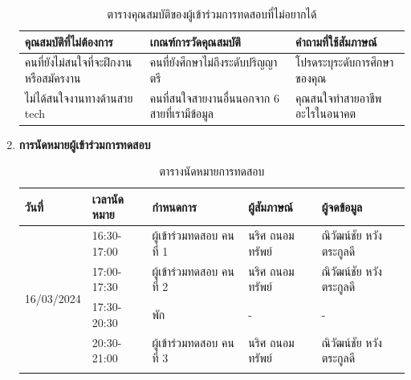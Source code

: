 \begin{enumerate}
\begin{table}[H]
\begin{tabularx}{\textwidth}{|X|X|X|}
              \end{tabularx}
          \end{table}
          \begin{table}[H]
              \caption{ตารางคุณสมบัติของผู้เข้าร่วมการทดสอบที่ไม่อยากได้}
              \label{tab:excludeUT}
              \begin{tabularx}{\textwidth}{|X|X|X|}
                  \hline
                  \textbf{คุณสมบัติที่ไม่ต้องการ}      & \textbf{เกณฑ์การวัดคุณสมบัติ}             & \textbf{คำถามที่ใช้สัมภาษณ์}    \\ \hline
                  คนที่ยังไม่สนใจที่จะฝึกงานหรือสมัครงาน & คนที่ยังศึกษาไม่ถึงระดับปริญญาตรี             & โปรดระบุระดับการศึกษาของคุณ   \\ \hline
                  ไม่ได้สนใจงานทางด้านสาย tech     & คนที่สนใจสายงานอื่นนอกจาก 6 สายที่เรามีข้อมูล & คุณสนใจทำสายอาชีพอะไรในอนาคต \\ \hline
              \end{tabularx}
          \end{table}
    \item \textbf{การนัดหมายผู้เข้าร่วมการทดสอบ}
          \begin{table}[H]
              \caption{ตารางนัดหมายการทดสอบ}
              \label{tab:schedule-UT}
              \begin{tabular}{|r|l|l|l|l|}
                  \hline
                  \multicolumn{1}{|l|}{\textbf{วันที่}} & \textbf{เวลานัดหมาย} & \textbf{กำหนดการ}   & \textbf{ผู้สัมภาษณ์} & \textbf{ผู้จดข้อมูล}            \\ \hline
                  \multirow[t]{5}{*}{16/03/2024}     & 16:30-17:00         & ผู้เข้าร่วมทดสอบ คนที่ 1 & นริศ ถนอมทรัพย์     & ณิวัฒน์ชัย หวังตระกูลดี            \\ \cline{2-5}
                                                     & 17:00-17:30         & ผู้เข้าร่วมทดสอบ คนที่ 2 & นริศ ถนอมทรัพย์     & ณิวัฒน์ชัย หวังตระกูลดี            \\ \cline{2-5}
                                                     & 17:30-20:30         & พัก                 & -                & -                           \\ \cline{2-5}
                                                     & 20:30-21:00         & ผู้เข้าร่วมทดสอบ คนที่ 3 & นริศ ถนอมทรัพย์     & ณิวัฒน์ชัย หวังตระกูลดี            \\ \cline{2-5}

\end{tabular}
\end{table}
\end{enumerate}
